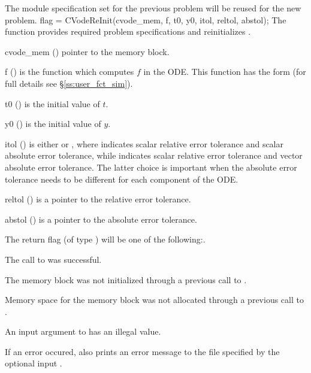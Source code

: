 The {\nvector} module specification  set for the previous problem
will be reused for the new problem.
{
  flag = CVodeReInit(cvode\_mem, f, t0, y0, itol, reltol, abstol);
}
{
  The function  provides required problem specifications 
  and reinitializes {\cvode}.
}
{
  \begin{args}[abstol]
  \item[cvode\_mem] ()
    pointer to the {\cvode} memory block.
  \item[f] ()
    is the {\C} function which computes $f$ in the ODE. This function has the form 
     (for full details see \S\ref{ss:user_fct_sim}).
  \item[t0] ()
    is the initial value of $t$.
  \item[y0] ()
    is the initial value of $y$. 
  \item[itol] () 
    is either  or , where  indicates scalar relative error 
    tolerance and scalar absolute error tolerance, while  indicates scalar
    relative error tolerance and vector absolute error tolerance. 
    The latter choice is important when the absolute error tolerance needs to
    be different for each component of the ODE. 
  \item[reltol] ()
    is a pointer to the relative error tolerance.
  \item[abstol] ()
    is a pointer to the absolute error tolerance.
  \end{args}
}
{
  The return flag  (of type ) will be one of the following:.
  \begin{args}
  \item[\Id{SUCCESS}]
    The call to  was successful.
  \item[\Id{CVREI\_NO\_MEM}] 
    The {\cvode} memory block was not initialized through a 
    previous call to .
  \item[\Id{CVREI\_NO\_MALLOC}] 
    Memory space for the {\cvode} memory block was not allocated through a 
    previous call to .
  \item[\Id{CVREI\_ILL\_INPUT}] 
    An input argument to  has an illegal value.
  \end{args}
}
{
  If an error occured,  also prints an error message to the
  file specified by the optional input .
}
